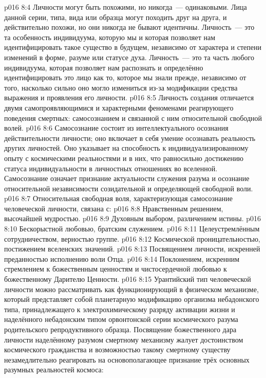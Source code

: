 \vs p016 8:4 Личности могут быть похожими, но никогда~--- одинаковыми. Лица данной серии, типа, вида или образца могут походить друг на друга, и действительно похожи, но они никогда не бывают идентичны. Личность~--- это та особенность индивидуума, которую мы  и которая позволяет нам идентифицировать такое существо в будущем, независимо от характера и степени изменений в форме, разуме или статусе духа. Личность~--- это та часть любого индивидуума, которая позволяет нам распознать и определённо идентифицировать это лицо как то, которое мы знали прежде, независимо от того, насколько сильно оно могло измениться из\hyp{}за модификации средства выражения и проявления его личности.
\vs p016 8:5 \pc Личность создания отличается двумя самопроявляющимися и характерными феноменами реагирующего поведения смертных: самосознанием и связанной с ним относительной свободной волей.
\vs p016 8:6 Самосознание состоит из интеллектуального осознания действительности личности; оно включает в себя умение осознавать реальность других личностей. Оно указывает на способность к индивидуализированному опыту с космическими реальностями и в них, что равносильно достижению статуса индивидуальности в личностных отношениях во вселенной. Самосознание означает признание актуальности служения разума и осознание относительной независимости созидательной и определяющей свободной воли.
\vs p016 8:7 \pc Относительная свободная воля, характеризующая самосознание человеческой личности, связана с:
\vs p016 8:8 Нравственным решением, высочайшей мудростью.
\vs p016 8:9 Духовным выбором, различением истины.
\vs p016 8:10 Бескорыстной любовью, братским служением.
\vs p016 8:11 Целеустремлённым сотрудничеством, верностью группе.
\vs p016 8:12 Космической проницательностью, постижением вселенских значений.
\vs p016 8:13 Посвящением личности, искренней преданностью исполнению воли Отца.
\vs p016 8:14 Поклонением, искренним стремлением к божественным ценностям и чистосердечной любовью к божественному Дарителю Ценности.
\vs p016 8:15 \pc Урантийский тип человеческой личности можно рассматривать как функционирующий в физическом механизме, который представляет собой планетарную модификацию организма небадонского типа, принадлежащего к электрохимическому разряду активации жизни и наделённого небадонским типом орвонтонской серии космического разума родительского репродуктивного образца. Посвящение божественного дара личности наделённому разумом смертному механизму жалует достоинством космического гражданства и возможностью такому смертному существу незамедлительно реагировать на основополагающее признание трёх основных разумных реальностей космоса:
